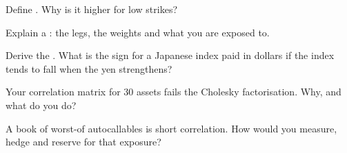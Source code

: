 \begin{interviewq}\label{iq:dv:multi-asset-options:2}
Define . Why is it higher for low strikes?
\end{interviewq}

\begin{interviewq}\label{iq:dv:multi-asset-options:3}
Explain a : the legs, the weights and what you are exposed to.
\end{interviewq}

\begin{interviewq}\label{iq:dv:multi-asset-options:4}
Derive the . What is the sign for a Japanese index paid in dollars if the index tends to fall when the yen
strengthens?
\end{interviewq}

\begin{interviewq}\label{iq:dv:multi-asset-options:5}
Your correlation matrix for 30 assets fails the Cholesky factorisation. Why, and what do you do?
\end{interviewq}

\begin{interviewq}\label{iq:dv:multi-asset-options:6}
A book of worst-of autocallables is short correlation. How would you measure, hedge and reserve for that exposure?
\end{interviewq}
